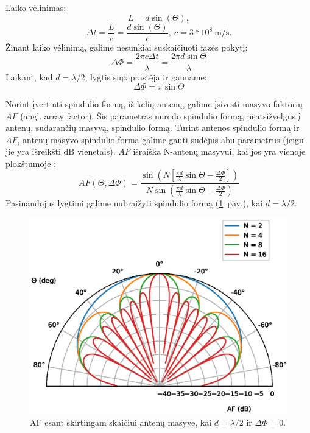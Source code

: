 \documentclass[main.tex]{subfiles}
\begin{document}
Laiko vėlinimas:
\begin{equation}
    L = d\sin(\Theta),
\end{equation}
\begin{equation}
    \Delta t = \frac{L}{c}=\frac{d\sin(\Theta)}{c},\ c = 3 * 10^8\ \mathrm{m/s}.
\end{equation}
Žinant laiko vėlinimą, galime nesunkiai suskaičiuoti fazės pokytį:
\begin{equation}
    \Delta \Phi = \frac{2\pi c \Delta t}{\lambda} = \frac{2\pi d \sin{\Theta}}{\lambda}
    \label{eq:phase_shift}
\end{equation}
Laikant, kad $d = \lambda / 2$,  lygtis supaprastėja ir gauname:
\begin{equation}
    \Delta \Phi = \pi \sin{\Theta}
    \label{eq:phase_shift_antenna_angle}
\end{equation}

Norint įvertinti spindulio formą, iš kelių antenų, galime įsivesti masyvo faktorių
$AF$ (angl. array factor). Šis parametras nurodo spindulio formą, neatsižvelgus
į antenų, sudarančių masyvą, spindulio formą. Turint antenos spindulio formą
ir $AF$, antenų masyvo spindulio forma galime gauti sudėjus abu parametrus
(jeigu jie yra išreikšti $\mathrm{dB}$ vienetais).
$AF$ išraiška N-antenų masyvui, kai jos yra vienoje plokštumoje \cite{phase_array_handbook}:
\begin{equation}
    AF(\Theta,\Delta \Phi) = \frac{\sin{\left( N\left[ \frac{\pi d}{\lambda} \sin{\Theta} - \frac{\Delta \Phi}{2} \right] \right)}}{N \sin{\left( \frac{\pi d}{\lambda}\sin{\Theta}-\frac{\Delta \Phi}{2}\right)}}
    \label{eq:array_factor}
\end{equation}
Pasinaudojus  lygtimi galime nubraižyti spindulio formą (\ref{fig:af_polar_plot}~pav.), kai $d=\lambda /2$.

\begin{figure}[h]
    \begin{centering}
    \includegraphics[scale=0.8]{drawings/af_polar_plot}
    \par\end{centering}
    \protect\caption{\label{fig:af_polar_plot}AF esant skirtingam skaičiui antenų masyve, kai $d=\lambda / 2$ ir $\Delta \Phi = 0$.}
\end{figure}
\end{document}
